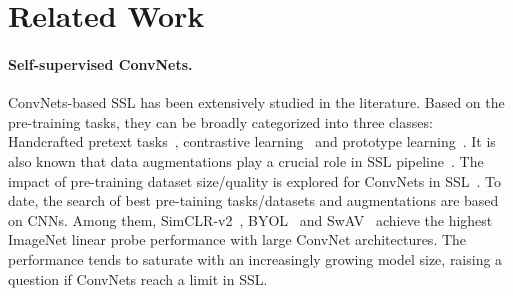 \documentclass{article} \usepackage{iclr2022_conference,times}
\begin{document}
\section{Related Work}
\label{sec:related_work_appendix}

\paragraph{Self-supervised ConvNets.}
ConvNets-based SSL has been extensively studied in the literature. Based on the pre-training tasks, they can be broadly categorized into three classes:  Handcrafted pretext tasks~\citep{doersch2015unsupervised,noroozi2016unsupervised,pathak2016context,gidaris2018unsupervised,zhang2016colorful,larsson2016learning,zhang2017split,pu2016variational,donahue2019large}, contrastive learning~\citep{dosovitskiy2015discriminative,zhuang2019local,oord2018representation,hjelm2018learning,bachman2019learning,he2020momentum,chen2020simple,grill2020bootstrap} and prototype learning~\citep{caron2018deepcluster,caron2020unsupervised,li2020prototypical,xie2016unsupervised,yang2016joint,ji2019invariant,zhan2020online}. 
It is also known that data augmentations play a crucial role in SSL pipeline~\citep{chen2020improved,caron2020unsupervised,tian2020makes,li2020self}. 
The impact of pre-training dataset size/quality is explored for ConvNets in SSL~\citep{goyal2021self,tian2021dnc}.
To date, the search of best pre-taining tasks/datasets and augmentations are based on CNNs. Among them, SimCLR-v2~\citep{chen2020big}, BYOL~\citep{grill2020bootstrap} and SwAV~\citep{caron2020unsupervised} achieve the highest ImageNet linear probe performance with large ConvNet architectures. The performance tends to saturate with an increasingly growing model size, raising a question if ConvNets reach a limit in SSL. 
\end{document}
